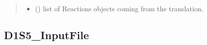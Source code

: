 \documentclass[letterpaper,10pt,english]{sphinxmanual}
\begin{document}
\begin{fulllineitems}
\begin{fulllineitems}
\begin{quote}
\begin{description}
\begin{itemize}
\item {} 
 () \textendash{} list of Reactions objects coming from the translation.

\end{itemize}


\end{description}\end{quote}

\end{fulllineitems}


\end{fulllineitems}



\subsection{D1S5\_InputFile}
\label{\detokenize{api/inputgeneration:d1s5-inputfile}}
\end{document}
